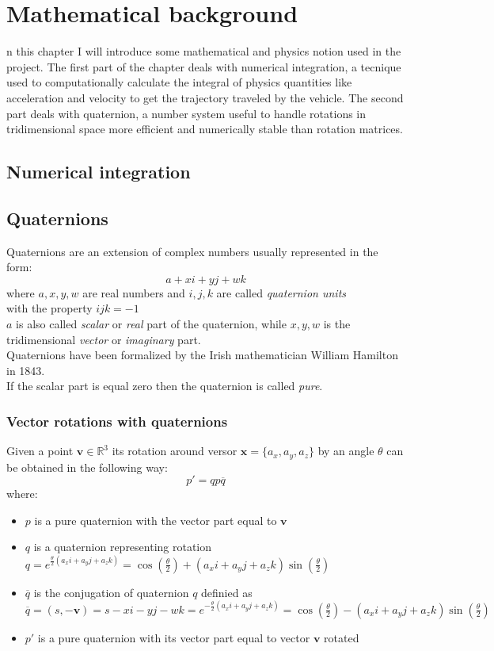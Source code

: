 \let\textcircled=\pgftextcircled
\chapter{Mathematical background}
\label{chap:math_background}

n this chapter I will introduce some mathematical and physics notion used in the project.
The first part of the chapter deals with numerical integration, a tecnique used to computationally calculate the integral of physics quantities like acceleration and velocity to get the trajectory traveled by the vehicle.
The second part deals with quaternion, a number system useful to handle rotations in tridimensional space more efficient and numerically stable than rotation matrices.

\section{Numerical integration}

\section{Quaternions}
Quaternions are an extension of complex numbers usually represented in the form:
$$ a + xi + yj + wk $$
where $a, x, y, w$ are real numbers and $i, j, k$ are called \textit{quaternion units} \\
with the property ${ijk=-1}$  \\
$a$ is also called \textit{scalar} or \textit{real} part of the quaternion, while $x,y,w$ is the tridimensional \textit{vector} or \textit{imaginary} part. \cite{amslaurea6701} \\
Quaternions have been formalized by the Irish mathematician William Hamilton in 1843. \\
If the scalar part is equal zero then the quaternion is called \textit{pure}.

\subsection{Vector rotations with quaternions}
Given a point $\boldsymbol{v} \in \mathbb{R}^3$ its rotation around versor $\boldsymbol{x}=\{a_x, a_y, a_z\}$ by an angle $\theta$ can be obtained in the following way:
$$ p' = q p \overline{q}$$
where: \\
\begin{itemize}
\item $p$ is a pure quaternion with the vector part equal to $\boldsymbol{v}$
\item $q$ is a quaternion representing rotation $q=e^{\frac{\theta}{2}(a_x i + a_y j + a_z k)}=\cos(\frac{\theta}{2})+(a_x i + a_y j + a_z k)\sin(\frac{\theta}{2})$ 
\item $\overline{q}$ is the conjugation of quaternion $q$ definied as \\
$\overline{q}=(s,-\boldsymbol{v})=s-xi-yj-wk=e^{-\frac{\theta}{2}(a_x i + a_y j + a_z k)}=\cos(\frac{\theta}{2})-(a_x i + a_y j + a_z k)\sin(\frac{\theta}{2})$
\item $p'$ is a pure quaternion with its vector part equal to vector $\boldsymbol{v}$ rotated
\end{itemize}

